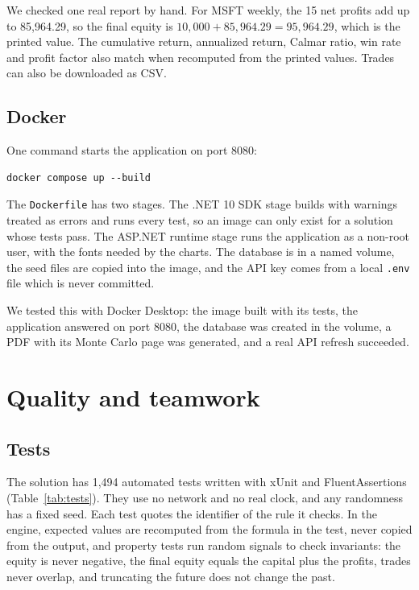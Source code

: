 \documentclass[11pt,a4paper]{article}
\newcommand{\code}[1]{\texttt{\small #1}}
\begin{document}
We checked one real report by hand. For MSFT weekly, the 15 net profits add up to 85,964.29, so the final equity is $10{,}000 + 85{,}964.29 = 95{,}964.29$, which is the printed value. The cumulative return, annualized return, Calmar ratio, win rate and profit factor also match when recomputed from the printed values. Trades can also be downloaded as CSV.

\subsection{Docker}

One command starts the application on port 8080:

\begin{lstlisting}
docker compose up --build
\end{lstlisting}

The \code{Dockerfile} has two stages. The .NET 10 SDK stage builds with warnings treated as errors and runs every test, so an image can only exist for a solution whose tests pass. The ASP.NET runtime stage runs the application as a non-root user, with the fonts needed by the charts. The database is in a named volume, the seed files are copied into the image, and the API key comes from a local \code{.env} file which is never committed.

We tested this with Docker Desktop: the image built with its tests, the application answered on port 8080, the database was created in the volume, a PDF with its Monte Carlo page was generated, and a real API refresh succeeded.

\section{Quality and teamwork}

\subsection{Tests}

The solution has 1,494 automated tests written with xUnit and FluentAssertions (Table~\ref{tab:tests}). They use no network and no real clock, and any randomness has a fixed seed. Each test quotes the identifier of the rule it checks. In the engine, expected values are recomputed from the formula in the test, never copied from the output, and property tests run random signals to check invariants: the equity is never negative, the final equity equals the capital plus the profits, trades never overlap, and truncating the future does not change the past.
\end{document}
